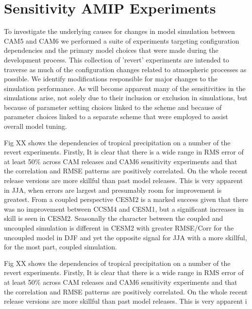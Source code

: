 \section{Sensitivity AMIP Experiments}
\label{sec:sensitivities}

To investigate the underlying causes for changes in model simulation between CAM5 and CAM6 we performed a suite of experiments targeting configuration dependencies and the primary model choices that were made during the development process. This collection of 'revert' experiments are intended to traverse as much of the configuration changes related to atmospheric processes as possible. We identify modifications responsible for major changes to the simulation performance. As will become apparent many of the sensitivities in the simulations arise, not solely due to their inclusion or exclusion in simulations, but because of parameter setting choices linked to the scheme and because of parameter choices linked to a separate scheme that were employed to assist overall model tuning.

Fig XX shows the dependencies of tropical precipitation on a number of the revert experiments. Firstly, It is clear that there is a wide range in RMS error of at least 50\% across CAM releases and CAM6 sensitivity experiments and that the correlation and RMSE patterns are positively correlated. On the whole recent release versions are more skillful than past model releases. This is very apparent in JJA, when errors are largest and presumably room for improvement is greatest. From a coupled perspective CESM2 is a marked success given that there was no improvement between CCSM4 and CESM1, but a significant increases in skill is seen in CESM2. Seasonally the character between the coupled and uncoupled simulation is different in CESM2 with greater RMSE/Corr for the uncoupled model in DJF and yet the opposite signal for JJA with a more skillful, for the most part, coupled simulation. 

Fig XX shows the dependencies of tropical precipitation on a number of the revert experiments. Firstly, It is clear that there is a wide range in RMS error of at least 50\% across CAM releases and CAM6 sensitivity experiments and that the correlation and RMSE patterns are positively correlated. On the whole recent release versions are more skillful than past model releases. This is very apparent i

